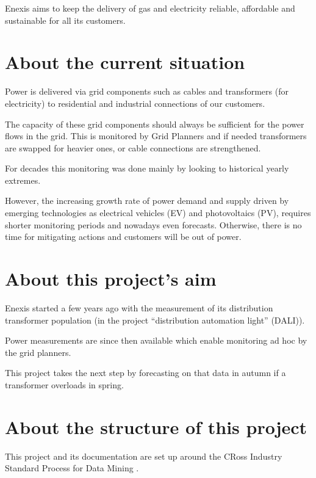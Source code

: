 \documentclass[letterpaper,10pt,english]{sphinxmanual}
\let\sphinxpxdimen\pdfpxdimen\else\newdimen\sphinxpxdimen
\begin{document}
Enexis aims to keep the delivery of gas and electricity reliable, affordable and sustainable for all its customers.


\section{About the current situation}
\label{\detokenize{general:about-the-current-situation}}
Power is delivered via grid components such as cables and transformers (for electricity) to residential and industrial connections of our customers.

The capacity of these grid components should always be sufficient for the power flows in the grid. This is monitored by Grid Planners and if needed transformers are swapped for heavier ones, or cable connections are strengthened.

For decades this monitoring was done mainly by looking to historical yearly extremes.

However, the increasing growth rate of power demand and supply driven by emerging technologies as electrical vehicles (EV) and photovoltaics (PV), requires shorter monitoring periods and nowadays even forecasts.
Otherwise, there is no time for mitigating actions and customers will be out of power.


\section{About this project’s aim}
\label{\detokenize{general:about-this-project-s-aim}}
Enexis started a few years ago with the measurement of its distribution transformer population (in the project “distribution automation light” (DALI)).

Power measurements are since then available which enable monitoring ad hoc by the grid planners.

This project takes the next step by forecasting on that data in autumn if a transformer overloads in spring.

\noindent{\hspace*{\fill}\sphinxincludegraphics[width=400\sphinxpxdimen]{{autumn_spring_load}.png}\hspace*{\fill}}


\section{About the structure of this project}
\label{\detokenize{general:about-the-structure-of-this-project}}
This project and its documentation are set up around the CRoss Industry Standard Process for Data Mining .
\end{document}
